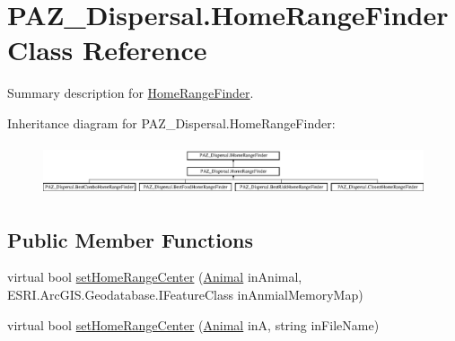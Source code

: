 \hypertarget{class_p_a_z___dispersal_1_1_home_range_finder}{\section{P\-A\-Z\-\_\-\-Dispersal.\-Home\-Range\-Finder Class Reference}
\label{class_p_a_z___dispersal_1_1_home_range_finder}
}


Summary description for \hyperlink{class_p_a_z___dispersal_1_1_home_range_finder}{Home\-Range\-Finder}.  


Inheritance diagram for P\-A\-Z\-\_\-\-Dispersal.\-Home\-Range\-Finder\-:\begin{figure}[H]
\begin{center}
\leavevmode
\includegraphics[height=1.510791cm]{class_p_a_z___dispersal_1_1_home_range_finder}
\end{center}
\end{figure}
\subsection*{Public Member Functions}
\begin{DoxyCompactItemize}
\item 
virtual bool \hyperlink{class_p_a_z___dispersal_1_1_home_range_finder_a45c5567745d96f6a57ad0a7a6678b978}{set\-Home\-Range\-Center} (\hyperlink{class_p_a_z___dispersal_1_1_animal}{Animal} in\-Animal, E\-S\-R\-I.\-Arc\-G\-I\-S.\-Geodatabase.\-I\-Feature\-Class in\-Anmial\-Memory\-Map)
\item 
virtual bool \hyperlink{class_p_a_z___dispersal_1_1_home_range_finder_a24dfc7d54c2bc67b175d7962b3de275b}{set\-Home\-Range\-Center} (\hyperlink{class_p_a_z___dispersal_1_1_animal}{Animal} in\-A, string in\-File\-Name)
\end{DoxyCompactItemize}
